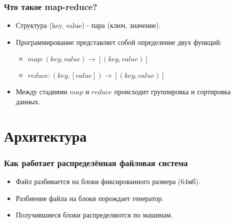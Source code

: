 \documentclass{beamer}
\begin{document}
    \begin{frame}
    \frametitle{Что такое map-reduce?}
        \begin{itemize}
            \item Структура (key, value) - пара (ключ, значение).
            \item Программирование представляет собой определение двух функций:
            \begin{itemize}
                \item $map: (key, value)\rightarrow[(key, value)]$
                \item $reduce: (key, [value])\rightarrow[(key, value)]$
            \end{itemize}
            \item Между стадиями $map$ и $reduce$ происходит группировка и сортировка данных.
            
        \end{itemize} 
    \end{frame}   

\section{Архитектура}

    \begin{frame}
    \frametitle{Как работает распределённая файловая система}
        \begin{itemize}
            \item Файл разбивается на блоки фиксированного размера (64мб).
            \item Разбиение файла на блоки порождает генератор.
            \item Получившиеся блоки распределяются по машинам.
        \end{itemize}
    \end{frame}


        
\end{document}
